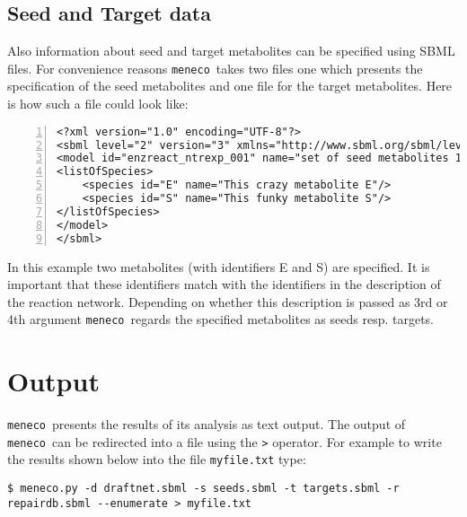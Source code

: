 \documentclass{article}
\newcommand\meneco{\texttt{meneco}}
\begin{document}
\subsection{Seed and Target data}
Also information about seed and target metabolites can be specified using SBML files.
For convenience reasons \meneco\ takes two files one which presents the specification of the seed metabolites and one file for the target metabolites.
Here is how such a file could look like:
\begin{Verbatim}[frame=single,numbers=left]
<?xml version="1.0" encoding="UTF-8"?>
<sbml level="2" version="3" xmlns="http://www.sbml.org/sbml/level2/version3">
<model id="enzreact_ntrexp_001" name="set of seed metabolites 1">
<listOfSpecies>
	<species id="E" name="This crazy metabolite E"/>
	<species id="S" name="This funky metabolite S"/>
</listOfSpecies>
</model>
</sbml>
\end{Verbatim}
In this example two metabolites (with identifiers E and S) are specified.
It is important that these identifiers match with the identifiers in the description of the reaction network.
Depending on whether this description is passed as 3rd or 4th argument \meneco\ regards the specified metabolites as seeds resp. targets.



\section{Output}

\meneco\ presents the results of its analysis as text output.
The output of \meneco\ can be redirected into a file using the \texttt{>} operator.
For example to write the results shown below into the file \texttt{myfile.txt} type:

\begin{Verbatim}[frame=single]
$ meneco.py -d draftnet.sbml -s seeds.sbml -t targets.sbml -r repairdb.sbml --enumerate > myfile.txt
\end{Verbatim}
\end{document}
